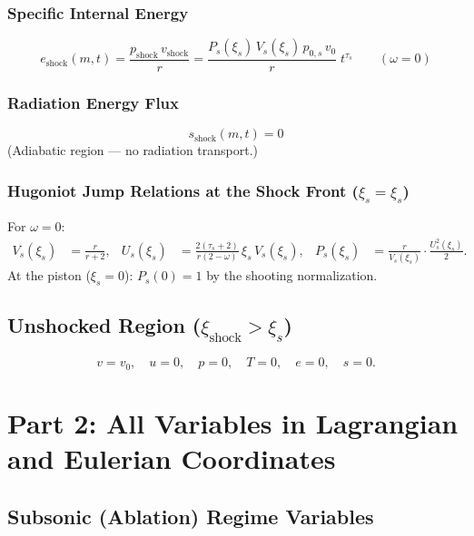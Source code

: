 \documentclass[11pt]{article}
\newcommand{\xsi}{\xi}
\newcommand{\xsis}{\xi_s}
\begin{document}
\subsubsection{Specific Internal Energy}
\begin{equation}
  \boxed{e_{\mathrm{shock}}(m,t) = \frac{p_{\mathrm{shock}}\,v_{\mathrm{shock}}}{r} = \frac{P_s(\xsi_s)\,V_s(\xsi_s)\,p_{0,s}\,v_0}{r}\;t^{\tau_s}}
  \qquad(\omega=0)
\end{equation}

\subsubsection{Radiation Energy Flux}
\begin{equation}
  \boxed{s_{\mathrm{shock}}(m,t) = 0}
\end{equation}
(Adiabatic region --- no radiation transport.)

\subsubsection{Hugoniot Jump Relations at the Shock Front ($\xsi_s = \xsis$)}

For $\omega = 0$:
\begin{align}
  V_s(\xsis) &= \frac{r}{r+2}, &
  U_s(\xsis) &= \frac{2(\tau_s+2)}{r(2-\omega)}\,\xsis\,V_s(\xsis), &
  P_s(\xsis) &= \frac{r}{V_s(\xsis)}\cdot\frac{U_s^2(\xsis)}{2}.
\end{align}
At the piston ($\xsi_s = 0$): $P_s(0) = 1$ by the shooting normalization.

\subsection{Unshocked Region ($\xsi_{\mathrm{shock}} > \xsis$)}

\begin{equation}
  v = v_0, \quad u = 0, \quad p = 0, \quad T = 0, \quad e = 0, \quad s = 0.
\end{equation}


\section{Part 2: All Variables in Lagrangian and Eulerian Coordinates}
\label{sec:variables}

\subsection{Subsonic (Ablation) Regime Variables}
\end{document}

